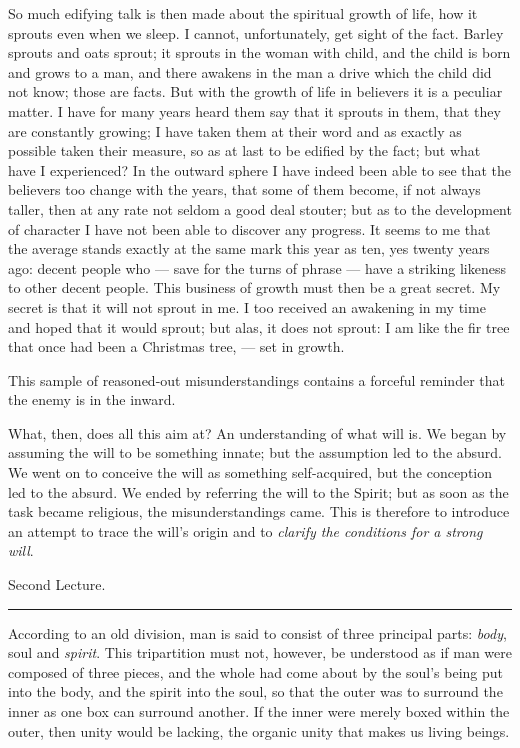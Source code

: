 \documentclass[12pt,a4paper,openany]{book}
\newcommand{\opage}[1]{\marginnote{\footnotesize\textit{[#1]}}}
\newcommand{\lecture}[1]{\clearpage\begin{center}{\large #1}\\[0.4em]\rule{3em}{0.4pt}\end{center}\medskip\noindent}
\begin{document}
So much edifying talk is then made about the spiritual
growth of life, how it sprouts even when we sleep. I cannot,
unfortunately, get sight of the fact. Barley sprouts
and oats sprout; it sprouts in the woman with child, and
the child is born and grows to a man, and there awakens in the man
a drive which the child did not know; those are facts.
But with the growth of life in believers it is a peculiar matter.
I have for many years heard them say that it sprouts in them,
that they are constantly growing; I have taken them at their word and
as exactly as possible taken their measure, so as at last
to be edified by the fact; but what have I
experienced? In the outward sphere I have indeed been able to see that the
believers too change with the years, that some of them
become, if not always taller, then at any rate not seldom a good deal
stouter; but as to the development of character I have not
been able to discover any progress. It seems
to me that the average stands exactly at the
same mark this year as ten, yes twenty years ago: decent
people who --- save for the turns of phrase --- have a
striking likeness to other decent people. This business of
growth must then be a great secret. My secret
is that it will not sprout in me. I too received an awakening
in my time and hoped that it would sprout;
\setcounter{footnote}{0}%
\opage{11}but alas, it does not sprout: I am like the fir tree that
once had been a Christmas tree, --- set in growth.

This sample of reasoned-out misunderstandings contains
a forceful reminder that the enemy is in the
inward.

What, then, does all this aim at? An understanding %
of what will is. We began by assuming the will to be
something innate; but the assumption led to the absurd.
We went on to conceive the will as something self-acquired,
but the conception led to the absurd. We ended by
referring the will to the Spirit; but as soon as the task became religious,
the misunderstandings came. This is therefore to introduce
an attempt to trace the will's origin and to \emph{clarify the conditions
for a strong will}.

\setcounter{footnote}{0}%
\lecture{Second Lecture.}\opage{12}

According to an old division, man is said to consist
of three principal parts: \emph{body}, soul and \emph{spirit}. This tripartition
must not, however, be understood as if man %
were composed of three pieces, and the whole had come about by
the soul's being put into the body, and the spirit into the soul,
so that the outer was to surround the inner as one box
can surround another. If the inner were merely boxed
within the outer, then unity would be lacking, the organic
unity that makes us living beings.
\end{document}
